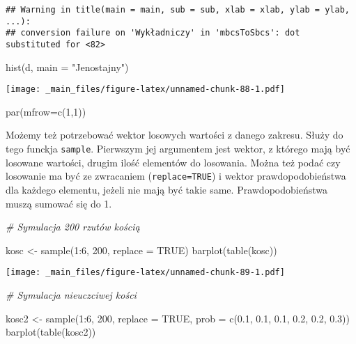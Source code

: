 \documentclass[
]{book}
\newenvironment{Shaded}{\begin{snugshade}}{\end{snugshade}}
\newcommand{\AttributeTok}[1]{\textcolor[rgb]{0.77,0.63,0.00}{#1}}
\newcommand{\CommentTok}[1]{\textcolor[rgb]{0.56,0.35,0.01}{\textit{#1}}}
\newcommand{\ConstantTok}[1]{\textcolor[rgb]{0.00,0.00,0.00}{#1}}
\newcommand{\DecValTok}[1]{\textcolor[rgb]{0.00,0.00,0.81}{#1}}
\newcommand{\FloatTok}[1]{\textcolor[rgb]{0.00,0.00,0.81}{#1}}
\newcommand{\FunctionTok}[1]{\textcolor[rgb]{0.00,0.00,0.00}{#1}}
\newcommand{\NormalTok}[1]{#1}
\newcommand{\OtherTok}[1]{\textcolor[rgb]{0.56,0.35,0.01}{#1}}
\newcommand{\SpecialCharTok}[1]{\textcolor[rgb]{0.00,0.00,0.00}{#1}}
\newcommand{\StringTok}[1]{\textcolor[rgb]{0.31,0.60,0.02}{#1}}
\begin{document}
\begin{verbatim}
## Warning in title(main = main, sub = sub, xlab = xlab, ylab = ylab, ...):
## conversion failure on 'Wykładniczy' in 'mbcsToSbcs': dot substituted for <82>
\end{verbatim}

\begin{Shaded}
\begin{Highlighting}[]
\FunctionTok{hist}\NormalTok{(d, }\AttributeTok{main =} \StringTok{"Jenostajny"}\NormalTok{)}
\end{Highlighting}
\end{Shaded}

\texttt{[image: \_main\_files/figure-latex/unnamed-chunk-88-1.pdf]}

\begin{Shaded}
\begin{Highlighting}[]
\FunctionTok{par}\NormalTok{(}\AttributeTok{mfrow=}\FunctionTok{c}\NormalTok{(}\DecValTok{1}\NormalTok{,}\DecValTok{1}\NormalTok{))}
\end{Highlighting}
\end{Shaded}

Możemy też potrzebować wektor losowych wartości z danego zakresu. Służy do tego funckja \texttt{sample}. Pierwszym jej argumentem jest wektor, z którego mają być losowane wartości, drugim ilość elementów do losowania. Można też podać czy losowanie ma być ze zwracaniem (\texttt{replace=TRUE}) i wektor prawdopodobieństwa dla każdego elementu, jeżeli nie mają być takie same. Prawdopodobieństwa muszą sumować się do 1.

\begin{Shaded}
\begin{Highlighting}[]
\CommentTok{\# Symulacja 200 rzutów kością}

\NormalTok{kosc }\OtherTok{\textless{}{-}} \FunctionTok{sample}\NormalTok{(}\DecValTok{1}\SpecialCharTok{:}\DecValTok{6}\NormalTok{, }\DecValTok{200}\NormalTok{, }\AttributeTok{replace =} \ConstantTok{TRUE}\NormalTok{)}
\FunctionTok{barplot}\NormalTok{(}\FunctionTok{table}\NormalTok{(kosc))}
\end{Highlighting}
\end{Shaded}

\texttt{[image: \_main\_files/figure-latex/unnamed-chunk-89-1.pdf]}

\begin{Shaded}
\begin{Highlighting}[]
\CommentTok{\# Symulacja nieuczciwej kości}

\NormalTok{kosc2 }\OtherTok{\textless{}{-}} \FunctionTok{sample}\NormalTok{(}\DecValTok{1}\SpecialCharTok{:}\DecValTok{6}\NormalTok{, }\DecValTok{200}\NormalTok{, }\AttributeTok{replace =} \ConstantTok{TRUE}\NormalTok{, }\AttributeTok{prob =} \FunctionTok{c}\NormalTok{(}\FloatTok{0.1}\NormalTok{, }\FloatTok{0.1}\NormalTok{, }\FloatTok{0.1}\NormalTok{, }\FloatTok{0.2}\NormalTok{, }\FloatTok{0.2}\NormalTok{, }\FloatTok{0.3}\NormalTok{))}
\FunctionTok{barplot}\NormalTok{(}\FunctionTok{table}\NormalTok{(kosc2))}
\end{Highlighting}
\end{Shaded}
\end{document}
